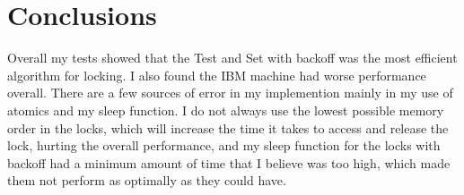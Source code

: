 \documentclass[12pt]{article}
\begin{document}
\section{Conclusions}\label{conclusions}
Overall my tests showed that the Test and Set with backoff was the most efficient algorithm
for locking. I also found the IBM machine had worse performance overall. There are
a few sources of error in my implemention mainly in my use of atomics and my sleep
function. I do not always use the lowest possible memory order in the locks, which will
increase the time it takes to access and release the lock, hurting the overall performance,
and my sleep function for the locks with backoff had a minimum amount of time that
I believe was too high, which made them not perform as optimally as they could have. 
\end{document}

